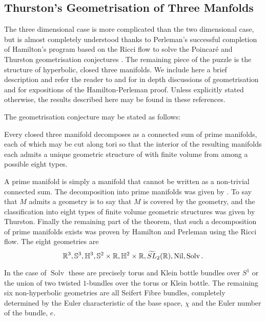 \documentclass[a4paper, 12pt]{amsart}
\begin{document}
\subsection{Thurston's Geometrisation of Three Manfolds}
\label{sec:geometrisation_3d}

The three dimensional case is more complicated than the two dimensional case, but is almost completely understood thanks to Perleman's successful completion \cite{2003math......7245P,2003math......3109P,2002math.....11159P} of Hamilton's program based on the Ricci flow \cite{Hamilton:/1982} to solve the Poincar\'e and Thurston geometrisation conjectures \cite{MR648524}. The remaining piece of the puzzle is the structure of hyperbolic, closed three manifolds. We include here a brief description and refer the reader to \cite{MR705527} and \cite{MR1435975} for in depth discussions of geometrisation and \cite{MR3186136,MR2334563,MR2460872} for expositions of the Hamilton-Perleman proof. Unless explicitly stated otherwise, the results described here may be found in these references.

The geometrisation conjecture may be stated as follows:

\begin{thm}
Every closed three manifold decomposes as a connected sum of prime manifolds, each of which may be cut along tori so that the interior of the resulting manifolds each admits a unique geometric structure of with finite volume from among a possible eight types.
\end{thm}

A prime manifold is simply a manifold that cannot be written as a non-trivial connected sum. The decomposition into prime manifolds was given by \cite{MR0142125}. To say that \(M\) admits a geometry is to say that \(M\) is covered by the geometry, and the classification into eight types of finite volume geometric structures was given by Thurston. Finally the remaining part of the theorem, that such a decomposition of prime manifolds exists was proven by Hamilton and Perleman using the Ricci flow. The eight geometries are
\[
\mathbb{R}^3, \mathbb{S}^3, \mathbb{H}^3, \mathbb{S}^2 \times \mathbb{R}, \mathbb{H}^2 \times \mathbb{R}, \widetilde{SL}_2(\mathbb{R}), \operatorname{Nil}, \operatorname{Solv}.
\]

In the case of \(\operatorname{Solv}\) these are precisely torus and Klein bottle bundles over \(S^1\) or the union of two twisted \(1\)-bundles over the torus or Klein bottle. The remaining six non-hyperbolic geometries are all Seifert Fibre bundles, completely determined by the Euler characteristic of the base space, \(\chi\) and the Euler number of the bundle, \(e\).
\end{document}
